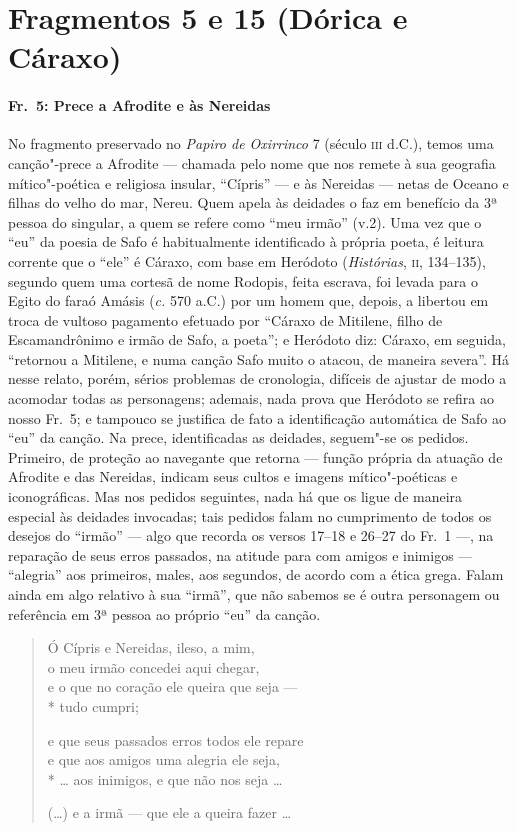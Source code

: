 \section{Fragmentos 5 e 15 (Dórica e Cáraxo)}

\paragraph{Fr.~5: Prece a Afrodite e às Nereidas}

{\small No fragmento preservado no \textit{Papiro de Oxirrinco} 7 (século \textsc{iii} d.C.),
temos uma canção"-prece a Afrodite --- chamada pelo nome que nos remete à sua
geografia mítico"-poética e religiosa insular, “Cípris” --- e às Nereidas
--- netas de Oceano e filhas do velho do mar, Nereu. Quem apela às deidades o faz
em benefício da 3ª pessoa do singular, a quem se refere como “meu
irmão” (v.2). Uma vez que o “eu” da poesia de Safo é habitualmente
identificado à própria poeta, é leitura corrente que o “ele” é Cáraxo, com base
em Heródoto (\textit{Histórias}, \textsc{ii}, 134--135), segundo quem uma
cortesã de nome Rodopis, feita escrava, foi levada para o Egito do faraó Amásis
(\textit{c.} 570 a.C.) por um homem que, depois, a libertou em troca de vultoso
pagamento efetuado por “Cáraxo de Mitilene, filho de Escamandrônimo e
irmão de Safo, a poeta”; e Heródoto diz: Cáraxo, em seguida, “retornou
a Mitilene, e numa canção Safo muito o atacou, de maneira severa”. Há nesse
relato, porém, sérios problemas de cronologia, difíceis de ajustar de modo a
acomodar todas as personagens; ademais, nada prova que Heródoto se refira ao
nosso Fr.~5; e tampouco se justifica de fato a identificação automática de
Safo ao “eu” da canção. Na prece, identificadas as deidades, seguem"-se os
pedidos. Primeiro, de proteção ao navegante que retorna --- função própria da
atuação de Afrodite e das Nereidas, indicam seus cultos e imagens
mítico"-poéticas e iconográficas. Mas nos pedidos seguintes, nada há que os
ligue de maneira especial às deidades invocadas; tais pedidos falam no
cumprimento de todos os desejos do “irmão” --- algo que recorda os
versos 17--18 e 26--27 do Fr.~1 ---, na reparação de seus erros passados, na
atitude para com amigos e inimigos --- “alegria” aos primeiros,
males, aos segundos, de acordo com a ética grega. Falam ainda em algo
relativo à sua ``irmã'', que não sabemos se é outra personagem ou
referência em 3ª pessoa ao próprio “eu” da canção.}

\begin{verse}
Ó Cípris e Nereidas, ileso, a mim,\\
o meu irmão concedei aqui chegar,\\
e o que no coração ele queira que seja ---\\*
tudo cumpri;

e que seus passados erros todos ele repare\\
e que aos amigos uma alegria ele seja,\\*
\ldots{} aos inimigos, e que não nos seja \ldots{}

(\ldots{}) e a irmã --- que ele a queira fazer \ldots{}
\end{verse}

